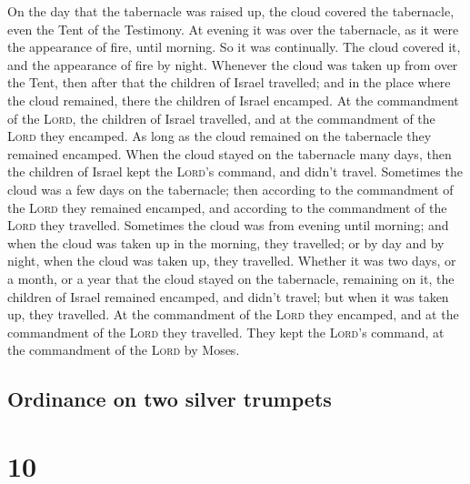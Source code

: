  On the day that the tabernacle was raised up, the cloud
covered the tabernacle, even the Tent of the Testimony. At evening it
was over the tabernacle, as it were the appearance of fire, until
morning.  So it was continually. The cloud covered it,
and the appearance of fire by night.  Whenever the cloud
was taken up from over the Tent, then after that the children of Israel
travelled; and in the place where the cloud remained, there the children
of Israel encamped.  At the commandment of the
\textsc{Lord}, the children of Israel travelled, and at the commandment
of the \textsc{Lord} they encamped. As long as the cloud remained on the
tabernacle they remained encamped.  When the cloud stayed
on the tabernacle many days, then the children of Israel kept the
\textsc{Lord}'s command, and didn't travel.  Sometimes
the cloud was a few days on the tabernacle; then according to the
commandment of the \textsc{Lord} they remained encamped, and according
to the commandment of the \textsc{Lord} they travelled. 
Sometimes the cloud was from evening until morning; and when the cloud
was taken up in the morning, they travelled; or by day and by night,
when the cloud was taken up, they travelled.  Whether it
was two days, or a month, or a year that the cloud stayed on the
tabernacle, remaining on it, the children of Israel remained encamped,
and didn't travel; but when it was taken up, they travelled.
 At the commandment of the \textsc{Lord} they encamped,
and at the commandment of the \textsc{Lord} they travelled. They kept
the \textsc{Lord}'s command, at the commandment of the \textsc{Lord} by
Moses.

\hypertarget{ordinance-on-two-silver-trumpets}{%
\subsection{Ordinance on two silver
trumpets}\label{ordinance-on-two-silver-trumpets}}

\hypertarget{section-9}{%
\section{10}\label{section-9}}

